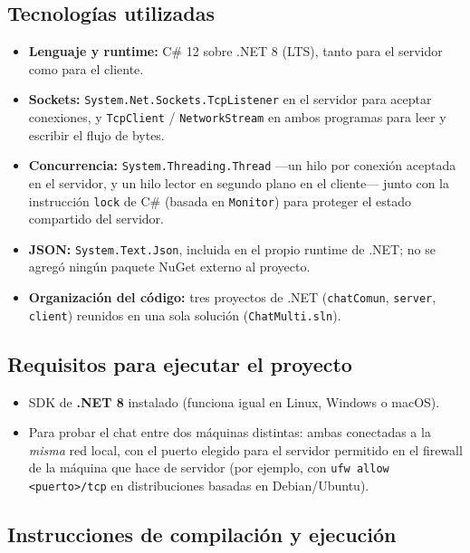 \documentclass[11pt,letterpaper]{article}
\begin{document}
\subsection{Tecnologías utilizadas}

\begin{itemize}
  \item \textbf{Lenguaje y runtime:} C\# 12 sobre .NET 8 (LTS), tanto para
        el servidor como para el cliente.
  \item \textbf{Sockets:} \texttt{System.Net.Sockets.TcpListener} en el
        servidor para aceptar conexiones, y \texttt{TcpClient} /
        \texttt{NetworkStream} en ambos programas para leer y escribir el
        flujo de bytes.
  \item \textbf{Concurrencia:} \texttt{System.Threading.Thread} —un hilo
        por conexión aceptada en el servidor, y un hilo lector en segundo
        plano en el cliente— junto con la instrucción \texttt{lock} de C\#
        (basada en \texttt{Monitor}) para proteger el estado compartido del
        servidor.
  \item \textbf{JSON:} \texttt{System.Text.Json}, incluida en el propio
        runtime de .NET; no se agregó ningún paquete NuGet externo al
        proyecto.
  \item \textbf{Organización del código:} tres proyectos de .NET
        (\texttt{chatComun}, \texttt{server}, \texttt{client})
        reunidos en una sola solución (\texttt{ChatMulti.sln}).
\end{itemize}

\subsection{Requisitos para ejecutar el proyecto}

\begin{itemize}
  \item SDK de \textbf{.NET 8} instalado (funciona igual en Linux, Windows
        o macOS).
  \item Para probar el chat entre dos máquinas distintas: ambas conectadas
        a la \emph{misma} red local, con el puerto elegido para el
        servidor permitido en el firewall de la máquina que hace de
        servidor (por ejemplo, con \texttt{ufw allow <puerto>/tcp} en
        distribuciones basadas en Debian/Ubuntu).
\end{itemize}

\subsection{Instrucciones de compilación y ejecución}
\end{document}
